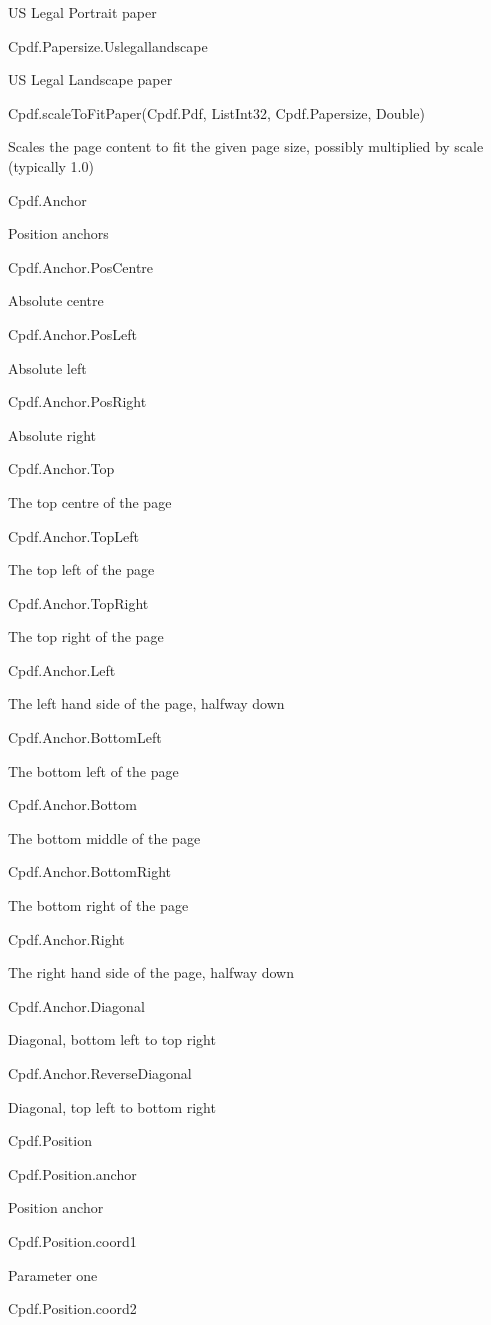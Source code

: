 US Legal Portrait paper

Cpdf.Papersize.Uslegallandscape

US Legal Landscape paper

Cpdf.scaleToFitPaper(Cpdf.Pdf, List{Int32}, Cpdf.Papersize, Double)

Scales the page content to fit the given page size, possibly multiplied by
scale (typically 1.0)

Cpdf.Anchor

Position anchors

Cpdf.Anchor.PosCentre

Absolute centre

Cpdf.Anchor.PosLeft

Absolute left

Cpdf.Anchor.PosRight

Absolute right

Cpdf.Anchor.Top

The top centre of the page

Cpdf.Anchor.TopLeft

The top left of the page

Cpdf.Anchor.TopRight

The top right of the page

Cpdf.Anchor.Left

The left hand side of the page, halfway down

Cpdf.Anchor.BottomLeft

The bottom left of the page

Cpdf.Anchor.Bottom

The bottom middle of the page

Cpdf.Anchor.BottomRight

The bottom right of the page

Cpdf.Anchor.Right

The right hand side of the page, halfway down

Cpdf.Anchor.Diagonal

Diagonal, bottom left to top right

Cpdf.Anchor.ReverseDiagonal

Diagonal, top left to bottom right

Cpdf.Position

Cpdf.Position.anchor

Position anchor

Cpdf.Position.coord1

Parameter one

Cpdf.Position.coord2

